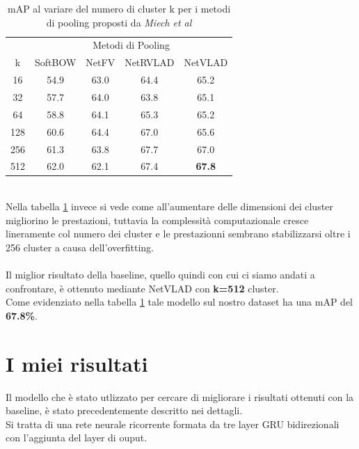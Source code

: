 \begin{table}[ht]
\label{table: baselinek16to512}
\caption{mAP al variare del numero di cluster k per i metodi di pooling proposti da \textit{Miech et al}}
\centering
\begin{tabular}{c| | c|c|c |  c}
&\multicolumn{4}{c}{Metodi di Pooling} \\
k & SoftBOW & NetFV & NetRVLAD & NetVLAD \\
\hline
16& 54.9 & 63.0 & 64.4 & 65.2 \\
32 & 57.7 & 64.0 & 63.8 & 65.1 \\
64& 58.8 &  64.1 & 65.3 & 65.2 \\
128& 60.6 & 64.4 & 67.0 & 65.6 \\
256& 61.3 & 63.8 & 67.7 & 67.0 \\
512 & 62.0 & 62.1 & 67.4 & \textbf{67.8} \\[1ex]

\end{tabular}
\end{table}
\\Nella tabella \ref{table: baselinek16to512} invece si vede come all'aumentare delle dimensioni dei cluster migliorino le prestazioni, tuttavia la complessità computazionale cresce lineramente col numero dei cluster e le prestazionni sembrano stabilizzarsi oltre i 256 cluster a causa dell'overfitting.\\
\\
Il miglior risultato della baseline, quello quindi con cui ci siamo andati a confrontare, è ottenuto mediante NetVLAD con \textbf{k=512} cluster.
\\Come evidenziato nella tabella \ref{table: baselinek16to512} tale modello sul nostro dataset ha una mAP del \textbf{67.8\%}.
\section{I miei risultati}
Il modello che è stato utlizzato per cercare di migliorare i risultati ottenuti con la baseline, è stato precedentemente descritto nei dettagli.
\\Si tratta di una rete neurale ricorrente formata da tre layer GRU bidirezionali con l'aggiunta del layer di ouput.
